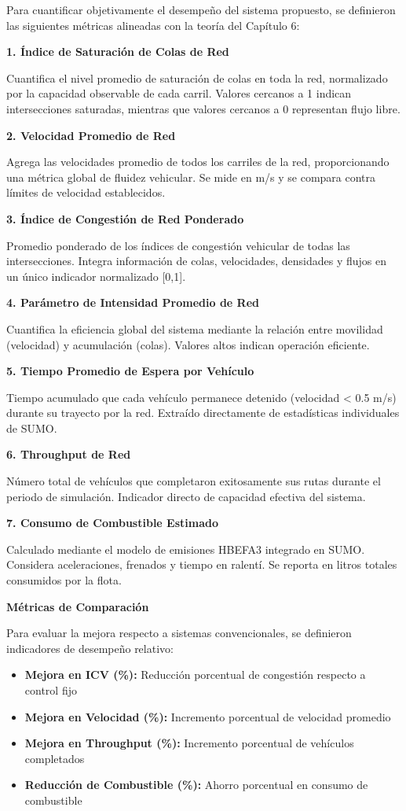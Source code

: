 \documentclass[12pt,a4paper,oneside]{report}
\begin{document}
Para cuantificar objetivamente el desempeño del sistema propuesto, se definieron las siguientes métricas alineadas con la teoría del Capítulo 6:

\textbf{1. Índice de Saturación de Colas de Red}

Cuantifica el nivel promedio de saturación de colas en toda la red, normalizado por la capacidad observable de cada carril. Valores cercanos a 1 indican intersecciones saturadas, mientras que valores cercanos a 0 representan flujo libre.

\textbf{2. Velocidad Promedio de Red}

Agrega las velocidades promedio de todos los carriles de la red, proporcionando una métrica global de fluidez vehicular. Se mide en m/s y se compara contra límites de velocidad establecidos.

\textbf{3. Índice de Congestión de Red Ponderado}

Promedio ponderado de los índices de congestión vehicular de todas las intersecciones. Integra información de colas, velocidades, densidades y flujos en un único indicador normalizado {[}0,1{]}.

\textbf{4. Parámetro de Intensidad Promedio de Red}

Cuantifica la eficiencia global del sistema mediante la relación entre movilidad (velocidad) y acumulación (colas). Valores altos indican operación eficiente.

\textbf{5. Tiempo Promedio de Espera por Vehículo}

Tiempo acumulado que cada vehículo permanece detenido (velocidad \textless{} 0.5 m/s) durante su trayecto por la red. Extraído directamente de estadísticas individuales de SUMO.

\textbf{6. Throughput de Red}

Número total de vehículos que completaron exitosamente sus rutas durante el periodo de simulación. Indicador directo de capacidad efectiva del sistema.

\textbf{7. Consumo de Combustible Estimado}

Calculado mediante el modelo de emisiones HBEFA3 integrado en SUMO. Considera aceleraciones, frenados y tiempo en ralentí. Se reporta en litros totales consumidos por la flota.

\textbf{Métricas de Comparación}

Para evaluar la mejora respecto a sistemas convencionales, se definieron indicadores de desempeño relativo:

\begin{itemize}
\item
  \textbf{Mejora en ICV (\%):} Reducción porcentual de congestión respecto a control fijo
\item
  \textbf{Mejora en Velocidad (\%):} Incremento porcentual de velocidad promedio
\item
  \textbf{Mejora en Throughput (\%):} Incremento porcentual de vehículos completados
\item
  \textbf{Reducción de Combustible (\%):} Ahorro porcentual en consumo de combustible
\end{itemize}
\end{document}

